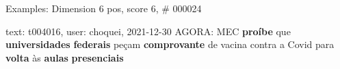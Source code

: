 \begin{frame}{Examples: Dimension 6 pos, score 6, \# 000024}
\footnotesize
\begin{exampleblock}{text: t004016, user: choquei, 2021-12-30}
 AGORA: MEC \textbf{proíbe} que \textbf{universidades} 
\textbf{federais} peçam \textbf{comprovante} de vacina contra a Covid para 
\textbf{volta} às \textbf{aulas} \textbf{presenciais} 
\end{exampleblock}
\end{frame}
